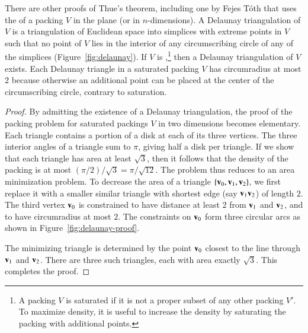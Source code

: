
\bigskip

There are other proofs of Thue's theorem, including one by Fejes
T\'oth that uses the  of a packing $V$
in the plane (or in $n$-dimensions).  A Delaunay triangulation of $V$
is a triangulation of Euclidean space into simplices with extreme
points in $V$ such that no point of $V$ lies in the interior of any
circumscribing circle of any of the simplices (Figure~\ref{fig:delaunay}).  
If $V$ is
,\footnote{A packing $V$ is saturated if it is not
  a proper subset of any other packing $V'$.  To maximize density, it
  is useful to increase the density by saturating the packing with
  additional points.} then a Delaunay triangulation of
$V$ exists.  Each Delaunay triangle in a saturated packing $V$ has
circumradius at most $2$ because otherwise an additional point can be
placed at the center of the circumscribing circle, contrary to saturation.

\figANNTKZP %

\begin{proof}
  By admitting the existence of a Delaunay triangulation, the proof of
  the packing problem for saturated packings $V$ in two dimensions becomes
  elementary.  Each triangle contains a portion of a disk at each of
  its three vertices.  The three interior angles of a triangle sum to
  $\pi$, giving half a disk per triangle.  If we show that each triangle has area
  at least $\sqrt{3}$, then it follows that the density of the packing is at most
  $(\pi/2)/\sqrt{3} = \pi/\sqrt{12}$.  The problem thus reduces to
  an area minimization problem.  To decrease the area of a triangle
  $\{{\mathbf v}_0,{\mathbf v}_1,{\mathbf v}_2\}$, we first replace it with a smaller similar
  triangle with shortest edge (say ${\mathbf v}_1{\mathbf v}_2$) of length $2$.  The
  third vertex ${\mathbf v}_0$ is constrained to have distance at least $2$
  from ${\mathbf v}_1$ and ${\mathbf v}_2$, and to have circumradius at most $2$.  The
  constraints on ${\mathbf v}_0$ form three circular arcs as shown in
  Figure~\ref{fig:delaunay-proof}.

\figCCKQLLH  %


The minimizing triangle is determined by the point ${\mathbf v}_0$ closest to
the line through ${\mathbf v}_1$ and ${\mathbf v}_2$.  There are three such triangles,
each with area exactly $\sqrt3$.  This completes the proof.
\end{proof}


